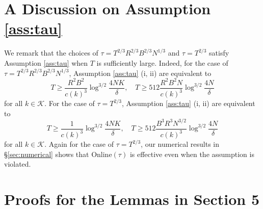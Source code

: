 \documentclass{article}
\theoremstyle{definition}
\newcommand{\KKK}{\mathcal{K}}
\begin{document}
\appendix
\section{A Discussion on Assumption \ref{ass:tau}}
We remark that the choices of $\tau = T^{2/3} R^{2/3} B^{2/3} N^{1/3} $ and $\tau = T^{2/3}$ satisfy Assumption \ref{ass:tau} when $T$ is sufficiently large. Indeed, for the case of $\tau = T^{2/3} R^{2/3} B^{2/3} N^{1/3}$, Assumption \ref{ass:tau} (i, ii) are equivalent to
\begin{equation*}
T \geq \frac{ R^2 B^2}{c(k)^3}\log^{3/2}\frac{4NK}{\delta}, \quad T\geq 512\frac{ R^2 B^2 N}{c(k)^3}\log^{3/2}\frac{4N}{\delta}
\end{equation*}
for all $k\in \KKK$. For the case of $\tau = T^{2/3}$, Assumption \ref{ass:tau} (i, ii) are equivalent to
\begin{equation*}
T\geq \frac{1}{c(k)^3}\log^{3/2}\frac{4NK}{\delta}, \quad T\geq 512\frac{ B^3 R^3 N^{3/2}}{c(k)^3}\log^{3/2}\frac{4N}{\delta} 
\end{equation*}
for all $k\in \KKK$. Again for the case of $\tau = T^{2/3}$, our numerical results in \S\ref{sec:numerical} shows that {\sc Online}$(\tau)$ is effective even when the assumption is violated.
\section{Proofs for the Lemmas in Section 5}
\end{document}
